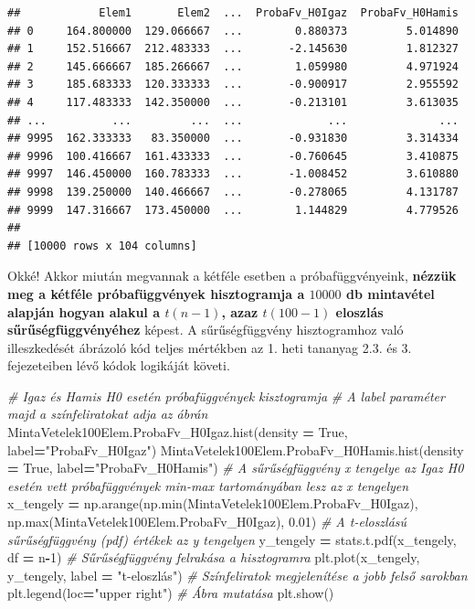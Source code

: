 \documentclass[
]{book}
\newenvironment{Shaded}{\begin{snugshade}}{\end{snugshade}}
\newcommand{\BuiltInTok}[1]{#1}
\newcommand{\CommentTok}[1]{\textcolor[rgb]{0.56,0.35,0.01}{\textit{#1}}}
\newcommand{\DecValTok}[1]{\textcolor[rgb]{0.00,0.00,0.81}{#1}}
\newcommand{\FloatTok}[1]{\textcolor[rgb]{0.00,0.00,0.81}{#1}}
\newcommand{\NormalTok}[1]{#1}
\newcommand{\OperatorTok}[1]{\textcolor[rgb]{0.81,0.36,0.00}{\textbf{#1}}}
\newcommand{\StringTok}[1]{\textcolor[rgb]{0.31,0.60,0.02}{#1}}
\newcommand{\VariableTok}[1]{\textcolor[rgb]{0.00,0.00,0.00}{#1}}
\begin{document}
\begin{verbatim}
##            Elem1       Elem2  ...  ProbaFv_H0Igaz  ProbaFv_H0Hamis
## 0     164.800000  129.066667  ...        0.880373         5.014890
## 1     152.516667  212.483333  ...       -2.145630         1.812327
## 2     145.666667  185.266667  ...        1.059980         4.971924
## 3     185.683333  120.333333  ...       -0.900917         2.955592
## 4     117.483333  142.350000  ...       -0.213101         3.613035
## ...          ...         ...  ...             ...              ...
## 9995  162.333333   83.350000  ...       -0.931830         3.314334
## 9996  100.416667  161.433333  ...       -0.760645         3.410875
## 9997  146.450000  160.783333  ...       -1.008452         3.610880
## 9998  139.250000  140.466667  ...       -0.278065         4.131787
## 9999  147.316667  173.450000  ...        1.144829         4.779526
## 
## [10000 rows x 104 columns]
\end{verbatim}

Okké! Akkor miután megvannak a kétféle esetben a próbafüggvényeink, \textbf{nézzük meg a kétféle próbafüggvények hisztogramja a \(10000\) db mintavétel alapján hogyan alakul a \(t(n-1)\), azaz \(t(100-1)\) eloszlás sűrűségfüggvényéhez} képest.
A sűrűségfüggvény hisztogramhoz való illeszkedését ábrázoló kód teljes mértékben az 1. heti tananyag 2.3. és 3. fejezeteiben lévő kódok logikáját követi.

\begin{Shaded}
\begin{Highlighting}[]
\CommentTok{\# Igaz és Hamis H0 esetén próbafüggvények kisztogramja}
\CommentTok{\# A \textquotesingle{}label\textquotesingle{} paraméter majd a színfeliratokat adja az ábrán}
\NormalTok{MintaVetelek100Elem.ProbaFv\_H0Igaz.hist(density }\OperatorTok{=} \VariableTok{True}\NormalTok{, label}\OperatorTok{=}\StringTok{"ProbaFv\_H0Igaz"}\NormalTok{)}
\NormalTok{MintaVetelek100Elem.ProbaFv\_H0Hamis.hist(density }\OperatorTok{=} \VariableTok{True}\NormalTok{, label}\OperatorTok{=}\StringTok{"ProbaFv\_H0Hamis"}\NormalTok{)}
\CommentTok{\# A sűrűségfüggvény x tengelye az Igaz H0 esetén vett próbafüggvények min{-}max tartományában lesz az \textquotesingle{}x\textquotesingle{} tengelyen}
\NormalTok{x\_tengely }\OperatorTok{=}\NormalTok{ np.arange(np.}\BuiltInTok{min}\NormalTok{(MintaVetelek100Elem.ProbaFv\_H0Igaz), np.}\BuiltInTok{max}\NormalTok{(MintaVetelek100Elem.ProbaFv\_H0Igaz), }\FloatTok{0.01}\NormalTok{)}
\CommentTok{\# A t{-}eloszlású sűrűségfüggvény (pdf) értékek az \textquotesingle{}y\textquotesingle{} tengelyen}
\NormalTok{y\_tengely }\OperatorTok{=}\NormalTok{ stats.t.pdf(x\_tengely, df }\OperatorTok{=}\NormalTok{ n}\OperatorTok{{-}}\DecValTok{1}\NormalTok{)}
\CommentTok{\# Sűrűségfüggvény felrakása a hisztogramra}
\NormalTok{plt.plot(x\_tengely, y\_tengely, label }\OperatorTok{=} \StringTok{"t{-}eloszlás"}\NormalTok{)}
\CommentTok{\# Színfeliratok megjelenítése a jobb felső sarokban}
\NormalTok{plt.legend(loc}\OperatorTok{=}\StringTok{"upper right"}\NormalTok{)}
\CommentTok{\# Ábra mutatása}
\NormalTok{plt.show()}
\end{Highlighting}
\end{Shaded}
\end{document}
